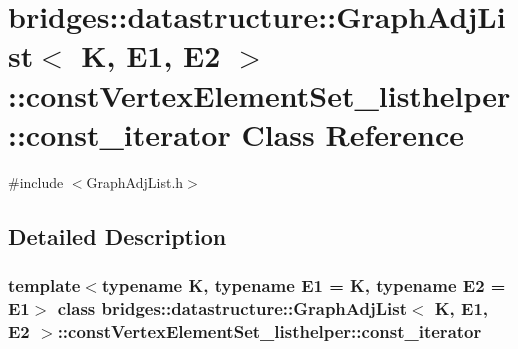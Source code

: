 \hypertarget{classbridges_1_1datastructure_1_1_graph_adj_list_1_1const_vertex_element_set__listhelper_1_1const__iterator}{}\section{bridges\+:\+:datastructure\+:\+:Graph\+Adj\+List$<$ K, E1, E2 $>$\+:\+:const\+Vertex\+Element\+Set\+\_\+listhelper\+:\+:const\+\_\+iterator Class Reference}
\label{classbridges_1_1datastructure_1_1_graph_adj_list_1_1const_vertex_element_set__listhelper_1_1const__iterator}


{\ttfamily \#include $<$Graph\+Adj\+List.\+h$>$}



\subsection{Detailed Description}
\subsubsection*{template$<$typename K, typename E1 = K, typename E2 = E1$>$\newline
class bridges\+::datastructure\+::\+Graph\+Adj\+List$<$ K, E1, E2 $>$\+::const\+Vertex\+Element\+Set\+\_\+listhelper\+::const\+\_\+iterator}

